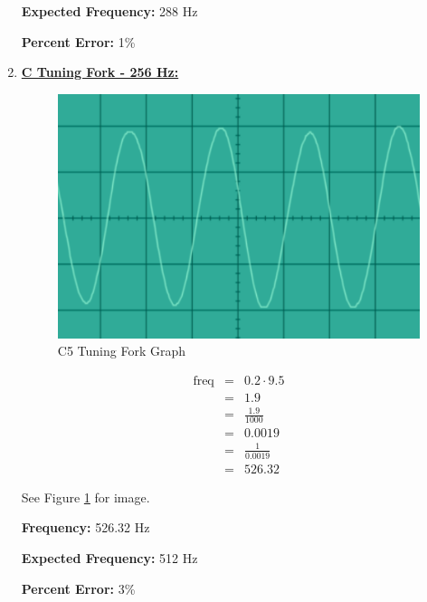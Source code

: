 \documentclass[12pt,oneside]{article}
\begin{document}
\begin{enumerate}
\textbf{Expected Frequency:} 288 Hz

\par

\textbf{Percent Error: } 1\%

\color{black}
\item \underline{\bf C Tuning Fork - 256 Hz:}
\color{red}

\begin{figure}[H]

{\centering \includegraphics[width=15cm,]{./images/c5} 

}

\caption{C5 Tuning Fork Graph}\label{fig:c5}
\end{figure}

\begin{eqnarray}
  \text{freq} & = & 0.2 \cdot 9.5 \\
              & = & 1.9 \\
              & = & \frac{1.9}{1000} \\
              & = & 0.0019 \\
              & = & \frac{1}{0.0019} \\
              & = & 526.32
\end{eqnarray}

See Figure \ref{fig:c5} for image.

\textbf{Frequency:} 526.32 Hz

\par

\textbf{Expected Frequency:} 512 Hz

\par

\textbf{Percent Error: } 3\%

\end{enumerate}
\end{document}
